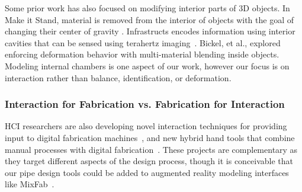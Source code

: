 Some prior work has also focused on modifying interior parts of 3D objects. 
In Make it Stand, material is removed from the interior of objects with the goal of changing their center of gravity \cite{Prevost-makeitstand}. Infrastructs encodes information using interior cavities that can be sensed using terahertz imaging~\cite{Willis-infrastructs}. Bickel, et al., explored enforcing deformation behavior with multi-material blending inside objects\cite{Bickel-deformation}. Modeling internal chambers is one aspect of our work, however our focus is on interaction rather than balance, identification, or deformation.  

\subsubsection{Interaction for Fabrication vs. Fabrication for Interaction}
HCI researchers are also developing novel interaction techniques for providing input to digital fabrication machines~\cite{Mueller-constructable,Willis-interactive,mixfab}, and new hybrid hand tools that combine manual processes with digital fabrication~\cite{zoran2013freed,rivers2012position}. These projects are complementary as they target different aspects of the design process, though it is conceivable that our pipe design tools could be added to augmented reality modeling interfaces like MixFab~\cite{mixfab}.